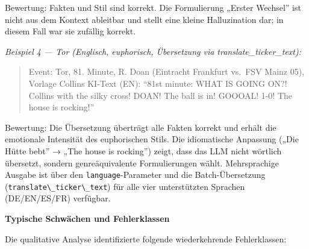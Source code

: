 Bewertung: Fakten und Stil sind korrekt. Die Formulierung „Erster
Wechsel'' ist nicht aus dem Kontext ableitbar und stellt eine kleine
Halluzination dar; in diesem Fall war sie zufällig korrekt.

\emph{Beispiel 4 --- Tor (Englisch, euphorisch, Übersetzung via
translate\_ticker\_text):}

\begin{quote}
Event: Tor, 81. Minute, R. Doan (Eintracht Frankfurt vs.~FSV Mainz 05),
Vorlage Collins KI-Text (EN): ``81st minute: WHAT IS GOING ON?! Collins
with the silky cross! DOAN! The ball is in! GOOOAL! 1-0! The house is
rocking!''
\end{quote}

Bewertung: Die Übersetzung überträgt alle Fakten korrekt und erhält die
emotionale Intensität des euphorischen Stils. Die idiomatische Anpassung
(„Die Hütte bebt'' → „The house is rocking'') zeigt, dass das LLM nicht
wörtlich übersetzt, sondern genreäquivalente Formulierungen wählt.
Mehrsprachige Ausgabe ist über den
\passthrough{\lstinline!language!}-Parameter und die Batch-Übersetzung
(\passthrough{\lstinline!translate\_ticker\_text!}) für alle vier
unterstützten Sprachen (DE/EN/ES/FR) verfügbar.

\textbf{Typische Schwächen und Fehlerklassen}

Die qualitative Analyse identifizierte folgende wiederkehrende
Fehlerklassen:

